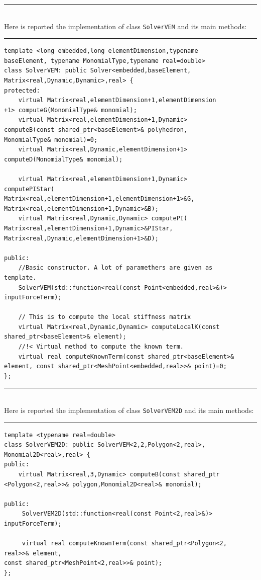 \noindent\rule{12.7cm}{1pt}\\

Here is reported the implementation of class \verb|SolverVEM| and its main methods:

\noindent\rule{12.7cm}{1pt}
\begin{verbatim}
template <long embedded,long elementDimension,typename 
baseElement, typename MonomialType,typename real=double>
class SolverVEM: public Solver<embedded,baseElement,
Matrix<real,Dynamic,Dynamic>,real> {
protected:
    virtual Matrix<real,elementDimension+1,elementDimension
+1> computeG(MonomialType& monomial);
    virtual Matrix<real,elementDimension+1,Dynamic> 
computeB(const shared_ptr<baseElement>& polyhedron,
MonomialType& monomial)=0;
    virtual Matrix<real,Dynamic,elementDimension+1> 
computeD(MonomialType& monomial);
	
    virtual Matrix<real,elementDimension+1,Dynamic> 
computePIStar(
Matrix<real,elementDimension+1,elementDimension+1>&G,
Matrix<real,elementDimension+1,Dynamic>&B);
    virtual Matrix<real,Dynamic,Dynamic> computePI(
Matrix<real,elementDimension+1,Dynamic>&PIStar,
Matrix<real,Dynamic,elementDimension+1>&D);
	
public:
    //Basic constructor. A lot of paramethers are given as 
template.
    SolverVEM(std::function<real(const Point<embedded,real>&)>
inputForceTerm);
	
    // This is to compute the local stiffness matrix
    virtual Matrix<real,Dynamic,Dynamic> computeLocalK(const
shared_ptr<baseElement>& element); 
    //!< Virtual method to compute the known term.
    virtual real computeKnownTerm(const shared_ptr<baseElement>& 
element, const shared_ptr<MeshPoint<embedded,real>>& point)=0; 
};
\end{verbatim}

\noindent\rule{12.7cm}{1pt}\\

Here is reported the implementation of class \verb|SolverVEM2D| and its main methods:

\noindent\rule{12.7cm}{1pt}
\begin{verbatim}
template <typename real=double>
class SolverVEM2D: public SolverVEM<2,2,Polygon<2,real>,
Monomial2D<real>,real> {
public:
    virtual Matrix<real,3,Dynamic> computeB(const shared_ptr
<Polygon<2,real>>& polygon,Monomial2D<real>& monomial);

public:
     SolverVEM2D(std::function<real(const Point<2,real>&)> 
inputForceTerm);
    
     virtual real computeKnownTerm(const shared_ptr<Polygon<2,
real>>& element,
const shared_ptr<MeshPoint<2,real>>& point);
};
\end{verbatim}

